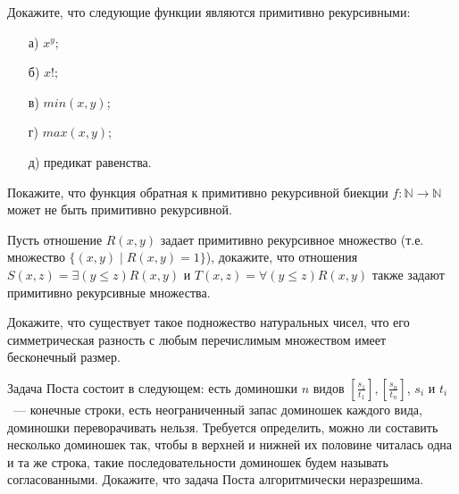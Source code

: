 
\newcommand{\dom}[2]{\left[\frac{#1}{#2}\right]}

\begin{task}
    Докажите, что следующие функции являются примитивно рекурсивными:
    \begin{enumerate}[topsep = 0pt, itemsep = -1ex]
        \item [а)] $x^y$;
        \item [б)] $x!$;
    	\item [в)] $min(x, y)$;
        \item [г)] $max(x, y)$;
	    \item [д)] предикат равенства.
    \end{enumerate}
\end{task}

\begin{task}
    Покажите, что функция обратная к примитивно рекурсивной биекции $f: \mathbb{N} \rightarrow \mathbb{N}$ может не быть
    примитивно рекурсивной.
\end{task}

\begin{task}
    Пусть отношение $R(x, y)$ задает примитивно рекурсивное множество (т.е. множество $\{(x, y) \mid R(x, y) = 1\}$), докажите,
    что отношения $S(x, z) = \exists (y \le z) R(x, y)$ и $T(x, z) = \forall (y \le z) R(x, y)$ также задают примитивно
    рекурсивные множества.
\end{task}

\begin{task}
    Докажите, что существует такое подножество натуральных чисел, что его симметрическая разность с любым перечислимым множеством
    имеет бесконечный размер.
\end{task}





\breakline

\begin{ptask}{21}
	Задача Поста состоит в следующем: есть доминошки $n$ видов $\dom{s_1}{t_1}, \dom{s_n}{t_n}$, $s_i$ и $t_i$~--- конечные
    строки, есть неограниченный запас доминошек каждого вида, доминошки переворачивать нельзя. Требуется определить, можно ли
    составить несколько доминошек так, чтобы в верхней и нижней их половине читалась одна и та же строка, такие последовательности
    доминошек будем называть согласованными. Докажите, что задача Поста алгоритмически неразрешима.
\end{ptask}


